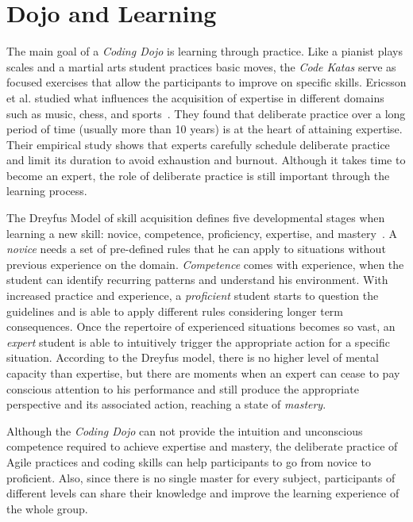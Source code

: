 \section{Dojo and Learning}\label{sec:learning}

The main goal of a \emph{Coding Dojo} is learning through practice. Like a pianist
plays scales and a martial arts student practices basic moves, the \emph{Code Katas}
serve as focused exercises that allow the participants to improve on specific skills.
Ericsson et al. studied what influences the acquisition of expertise in
different domains such as music, chess, and sports~\cite{DeliberatePractice}. They found
that deliberate practice over a long period of time (usually more than 10 years) is at the
heart of attaining expertise. Their empirical study shows that experts carefully schedule
deliberate practice and limit its duration to avoid exhaustion and burnout. Although it
takes time to become an expert, the role of deliberate practice is still important through
the learning process.

The Dreyfus Model of skill acquisition defines five developmental stages when learning
a new skill: novice, competence, proficiency, expertise, and mastery~\cite{Dreyfus}. A
\emph{novice} needs a set of pre-defined rules that he can apply to situations without
previous experience on the domain. \emph{Competence} comes with experience, when the student
can identify recurring patterns and understand his environment. With increased practice and
experience, a \emph{proficient} student starts to question the guidelines and is able to
apply different rules considering longer term consequences. Once the repertoire of
experienced situations becomes so vast, an \emph{expert} student is able to intuitively
trigger the appropriate action for a specific situation. According to the Dreyfus model,
there is no higher level of mental capacity than expertise, but there are moments when an
expert can cease to pay conscious attention to his performance and still produce the
appropriate perspective and its associated action, reaching a state of \emph{mastery}.

Although the \emph{Coding Dojo} can not provide the intuition and unconscious competence
required to achieve expertise and mastery, the deliberate practice of Agile practices
and coding skills can help participants to go from novice to proficient. Also, since
there is no single master for every subject, participants of different levels can
share their knowledge and improve the learning experience of the whole group.

